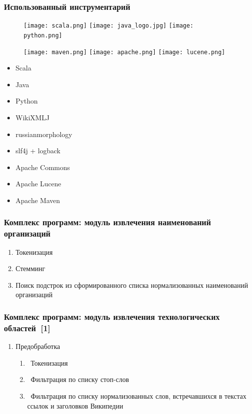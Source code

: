 \documentclass{beamer}
\begin{document}
\begin{frame}\frametitle{Использованный инструментарий}

\begin{figure}[ht]
\begin{center}
\texttt{[image: scala.png]}
\texttt{[image: java\_logo.jpg]}
\texttt{[image: python.png]}
\end{center}
\end{figure}

\begin{figure}[ht]
\begin{center}
\texttt{[image: maven.png]}
\texttt{[image: apache.png]}
\texttt{[image: lucene.png]}
\end{center}
\end{figure}

\begin{itemize}
    \item Scala
    \item Java
    \item Python
    \item WikiXMLJ
    \item russianmorphology
    \item slf4j + logback
    \item Apache Commons
    \item Apache Lucene
    \item Apache Maven
\end{itemize}

\end{frame}


\begin{frame}\frametitle{Комплекс программ: модуль извлечения наименований организаций}
\begin{enumerate}
\item Токенизация
\item Стемминг
\item Поиск подстрок из сформированного списка нормализованных наименований организаций
\end{enumerate}
\end{frame}

\begin{frame}\frametitle{Комплекс программ: модуль извлечения технологических областей~[1]}
\begin{enumerate}
        \item Предобработка
        \begin{enumerate}
		\item ~Токенизация
		\item ~Фильтрация по списку стоп-слов
		\item ~Фильтрация по списку нормализованных слов, встречавшихся в текстах ссылок и заголовков Википедии
        \end{enumerate}
\end{enumerate}
\end{frame}
\end{document}
